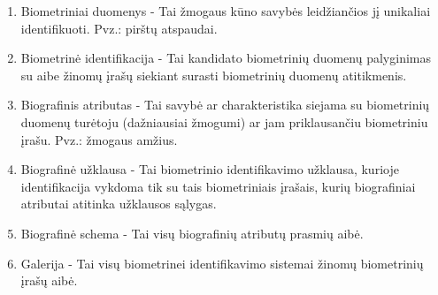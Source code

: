 \begin{enumerate}
\item Biometriniai duomenys - Tai žmogaus kūno savybės leidžiančios jį unikaliai identifikuoti. Pvz.: pirštų atspaudai.
\item Biometrinė identifikacija - Tai kandidato biometrinių duomenų palyginimas su aibe žinomų įrašų siekiant surasti biometrinių duomenų atitikmenis.
\item Biografinis atributas - Tai savybė ar charakteristika siejama su biometrinių duomenų turėtoju (dažniausiai žmogumi) ar jam priklausančiu biometriniu įrašu. Pvz.: žmogaus amžius.
\item Biografinė užklausa - Tai biometrinio identifikavimo užklausa, kurioje identifikacija vykdoma tik su tais biometriniais įrašais, kurių biografiniai atributai atitinka užklausos sąlygas.
\item Biografinė schema - Tai visų biografinių atributų prasmių aibė.
\item Galerija - Tai visų biometrinei identifikavimo sistemai žinomų biometrinių įrašų aibė.
\end{enumerate}


